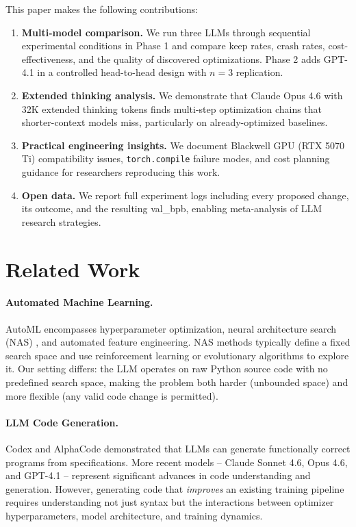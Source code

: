 \documentclass[11pt]{article}
\begin{document}
This paper makes the following contributions:

\begin{enumerate}[leftmargin=*]
    \item \textbf{Multi-model comparison.} We run three LLMs through sequential experimental conditions in Phase 1 and compare keep rates, crash rates, cost-effectiveness, and the quality of discovered optimizations. Phase 2 adds GPT-4.1 in a controlled head-to-head design with $n=3$ replication.
    \item \textbf{Extended thinking analysis.} We demonstrate that Claude Opus 4.6 with 32K extended thinking tokens finds multi-step optimization chains that shorter-context models miss, particularly on already-optimized baselines.
    \item \textbf{Practical engineering insights.} We document Blackwell GPU (RTX 5070 Ti) compatibility issues, \texttt{torch.compile} failure modes, and cost planning guidance for researchers reproducing this work.
    \item \textbf{Open data.} We report full experiment logs including every proposed change, its outcome, and the resulting val\_bpb, enabling meta-analysis of LLM research strategies.
\end{enumerate}

\section{Related Work}
\label{sec:related}

\paragraph{Automated Machine Learning.}
AutoML \citep{hutter2019automl} encompasses hyperparameter optimization, neural architecture search (NAS) \citep{zoph2017nas}, and automated feature engineering. NAS methods typically define a fixed search space and use reinforcement learning or evolutionary algorithms to explore it. Our setting differs: the LLM operates on raw Python source code with no predefined search space, making the problem both harder (unbounded space) and more flexible (any valid code change is permitted).

\paragraph{LLM Code Generation.}
Codex \citep{chen2021codex} and AlphaCode demonstrated that LLMs can generate functionally correct programs from specifications. More recent models -- Claude Sonnet 4.6, Opus 4.6, and GPT-4.1 -- represent significant advances in code understanding and generation. However, generating code that \emph{improves} an existing training pipeline requires understanding not just syntax but the interactions between optimizer hyperparameters, model architecture, and training dynamics.
\end{document}

